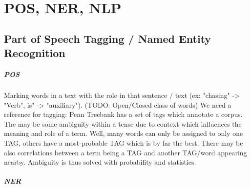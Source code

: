 \chapter{POS, NER, NLP}

\section{Part of Speech Tagging / Named Entity Recognition}

\paragraph{POS}

Marking words in a text with the role in that sentence / text (ex: "chasing" -> "Verb", is" -> "auxiliary").
(TODO: Open/Closed class of words)
We need a reference for tagging: Penn Treebank has a set of tags which annotate a corpus.
The may be some ambiguity within a tense due to context which influences the meaning and role of a term.
Well, many words can only be assigned to only one TAG, others have a most-probable TAG which is by far the best.
There may be also correlations between a term being a TAG and another TAG/word appearing nearby.
Ambiguity is thus solved with probability and statistics.

\paragraph{NER}

\paragraph{}
